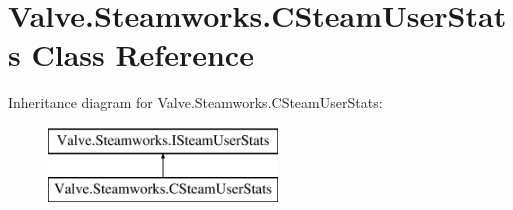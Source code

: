 \hypertarget{classValve_1_1Steamworks_1_1CSteamUserStats}{}\section{Valve.\+Steamworks.\+C\+Steam\+User\+Stats Class Reference}
\label{classValve_1_1Steamworks_1_1CSteamUserStats}
Inheritance diagram for Valve.\+Steamworks.\+C\+Steam\+User\+Stats\+:\begin{figure}[H]
\begin{center}
\leavevmode
\includegraphics[height=2.000000cm]{classValve_1_1Steamworks_1_1CSteamUserStats}
\end{center}
\end{figure}
